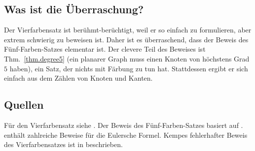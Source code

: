 \begin{figure}[ht]
{
}
\label{f.five-kempe2}
\label{f.five-kempe2-share}
\end{figure}

\subsection*{Was ist die Überraschung?}

Der Vierfarbensatz ist berühmt-berüchtigt, weil er so einfach zu formulieren, aber extrem schwierig zu beweisen ist. Daher ist es überraschend, dass der Beweis des Fünf-Farben-Satzes elementar ist. Der clevere Teil des Beweises ist Thm.~\ref{thm.degree5} (ein planarer Graph muss einen Knoten von höchstens Grad $5$ haben), ein Satz, der nichts mit Färbung zu tun hat. Stattdessen ergibt er sich einfach aus dem Zählen von Knoten und Kanten.

\subsection*{Quellen}
Für den Vierfarbensatz siehe \cite{thomas,wiki:four}. Der Beweis des Fünf-Farben-Satzes basiert auf \cite{thebook,wiki:five}.
\cite{eppstein} enthält zahlreiche Beweise für die Eulersche Formel. Kempes fehlerhafter Beweis des Vierfarbensatzes ist in \cite{sipka} beschrieben.
